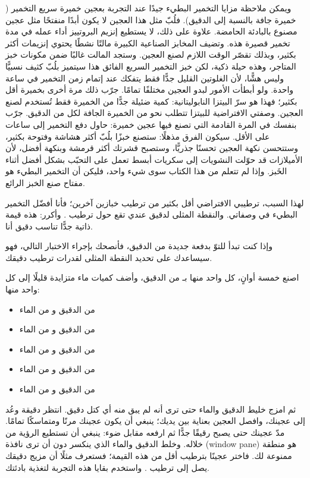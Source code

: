 ويمكن ملاحظة مزايا التخمير البطيء جيدًا عند التجربة بعجين خميرة سريع التخمير ( خميرة جافة بالنسبة إلى الدقيق). فلُبّ مثل هذا العجين لا يكون أبدًا منفتحًا مثل عجين مصنوع بالبادئة الحامضة. علاوة على ذلك، لا يستطيع إنزيم البروتييز أداء عمله في مدة تخمير قصيرة هذه. وتضيف المخابز الصناعية الكبيرة مالتًا نشطًا يحتوي إنزيمات أكثر بكثير، وبذلك تقصّر الوقت اللازم لصنع العجين. وستجد المالت غالبًا ضمن مكونات خبز المتاجر، وهذه حيلة ذكية، لكن خبز التخمير السريع الفائق هذا سيتميز بلُبّ كثيف نسبيًّا وليس هشًّا، لأن الغلوتين القليل جدًّا فقط يتفكك عند إتمام زمن التخمير في  ساعة واحدة. ولو أبطأت الأمور لبدو العجين مختلفًا تمامًا. جرّب ذلك مرة أخرى بخميرة أقل بكثير؛ فهذا هو سرّ البيتزا النابوليتانية: كمية ضئيلة جدًّا من الخميرة فقط تُستخدم لصنع العجين. وصفتي الافتراضية للبيتزا تتطلب نحو  من الخميرة الجافة لكل  من الدقيق. جرّب بنفسك في المرة القادمة التي تصنع فيها عجين خميرة: حاول دفع التخمير إلى  ساعات على الأقل. سيكون الفرق مذهلًا: ستصنع خبزًا بلُبّ أكثر هشاشة وفتوحة بكثير، وستتحسن نكهة العجين تحسنًا جذريًّا، وستصبح قشرتك أكثر قرمشة وبنكهة أفضل، لأن الأميلازات قد حوّلت النشويات إلى سكريات أبسط تعمل على التحبّب بشكل أفضل أثناء الخَبز. وإذا لم تتعلم من هذا الكتاب سوى شيء واحد، فليكن أن التخمير البطيء هو مفتاح صنع الخبز الرائع.

لهذا السبب، ترطيبي الافتراضي أقل بكثير من ترطيب خبازين آخرين؛ فأنا أفضّل التخمير البطيء في وصفاتي. والنقطة المثلى لدقيق عندي تقع حول ترطيب . وأكرر: هذه قيمة ذاتية جدًّا تناسب دقيق أنا.

وإذا كنت تبدأ للتوّ بدفعة جديدة من الدقيق، فأنصحك بإجراء الاختبار التالي، فهو سيساعدك على تحديد النقطة المثلى لقدرات ترطيب دقيقك.

اصنع خمسة أوانٍ، كل واحد منها بـ من الدقيق، وأضف كميات ماء متزايدة قليلًا إلى كل واحد منها:

\begin{itemize}
  \item {} من الدقيق و من الماء
  \item {} من الدقيق و من الماء
  \item {} من الدقيق و من الماء
  \item {} من الدقيق و من الماء
  \item {} من الدقيق و من الماء
\end{itemize}

ثم امزج خليط الدقيق والماء حتى ترى أنه لم يبق منه أي كتل دقيق. انتظر  دقيقة وعُد إلى عجينك، وافصل العجين بعناية بين يديك؛ ينبغي أن يكون عجينك مرنًا ومتماسكًا تمامًا. مدّ عجينك حتى يصبح رقيقًا جدًّا ثم ارفعه مقابل ضوء: ينبغي أن تستطيع الرؤية من خلاله. وخلط الدقيق والماء الذي ينكسر دون أن ترى نافذة (window pane) هو منطقة ممنوعة لك. فاختر عجينًا بترطيب أقل من هذه القيمة؛ فستعرف مثلًا أن مزيج دقيقك يصل إلى ترطيب . واستخدم بقايا هذه التجربة لتغذية بادئتك.

